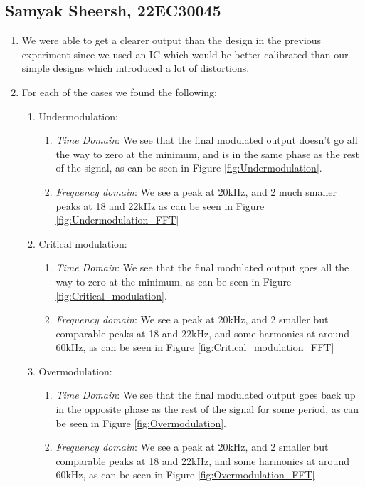 \documentclass{article}
\begin{document}
 \subsection{Samyak Sheersh, 22EC30045}
 \begin{enumerate}
   \item We were able to get a clearer output than the design in the previous experiment since we used an IC which would be better calibrated than our simple designs which  introduced a lot of distortions.  
   \item For each of the cases we found the following:
     \begin{enumerate}
       \item Undermodulation:
         \begin{enumerate}
           \item \emph{Time Domain}: We see that the final modulated output doesn't go all the way to zero at the minimum, and is in the same phase as the rest of the signal, as can be seen in Figure \ref{fig:Undermodulation}.
           \item \emph{Frequency domain}: We see a peak at 20kHz, and 2 much smaller peaks at 18 and 22kHz as can be seen in Figure \ref{fig:Undermodulation_FFT}
         \end{enumerate}
        \item Critical modulation:
         \begin{enumerate}
           \item \emph{Time Domain}: We see that the final modulated output goes all the way to zero at the minimum, as can be seen in Figure \ref{fig:Critical_modulation}.
           \item \emph{Frequency domain}: We see a peak at 20kHz, and 2 smaller but comparable peaks at 18 and 22kHz, and some harmonics at around 60kHz, as can be seen in Figure \ref{fig:Critical_modulation_FFT}
         \end{enumerate}
        \item Overmodulation:
         \begin{enumerate}
           \item \emph{Time Domain}: We see that the final modulated output goes back up in the opposite phase as the rest of the signal for some period, as can be seen in Figure \ref{fig:Overmodulation}.
           \item \emph{Frequency domain}: We see a peak at 20kHz, and 2 smaller but comparable peaks at 18 and 22kHz, and some harmonics at around 60kHz, as can be seen in Figure \ref{fig:Overmodulation_FFT}

\end{enumerate}
\end{enumerate}
\end{enumerate}
\end{document}
